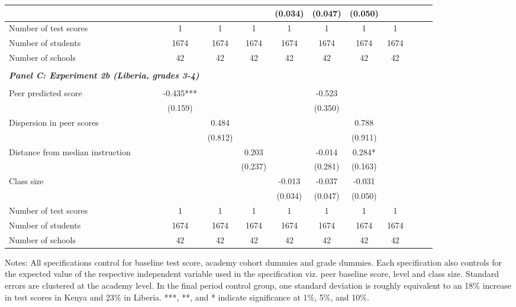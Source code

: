 \begin{center}
\begin{scriptsize}
\begin{threeparttable}
\begin{tabular} {@{} l l c c c c c c c c c c  @{}}
                 &  &  &  &  & (0.034) & (0.047) & (0.050) \\
\midrule
Number of test scores &  & 1 & 1 & 1 & 1 & 1 & 1 & 1 \\
Number of students &  & 1674 & 1674 & 1674 & 1674 & 1674 & 1674 & 1674 \\
Number of schools &  & 42 & 42 & 42 & 42 & 42 & 42 & 42 \\
 \midrule
\\
\multicolumn{3}{l}{\textbf{\textit{Panel C: Experiment 2b (Liberia, grades 3-4)}}} \\
\\
Peer predicted score &  & -0.435*** &  &  &  & -0.523 &  \\
                 &  & (0.159) &  &  &  & (0.350) &  \\
Dispersion in peer scores &  &  & 0.484 &  &  &  & 0.788 \\
                 &  &  & (0.812) &  &  &  & (0.911) \\
Distance from median instruction &  &  &  & 0.203 &  & -0.014 & 0.284* \\
                 &  &  &  & (0.237) &  & (0.281) & (0.163) \\
Class size &  &  &  &  & -0.013 & -0.037 & -0.031 \\
                 &  &  &  &  & (0.034) & (0.047) & (0.050) \\
\midrule
Number of test scores &  & 1 & 1 & 1 & 1 & 1 & 1 & 1 \\
Number of students &  & 1674 & 1674 & 1674 & 1674 & 1674 & 1674 & 1674 \\
Number of schools &  & 42 & 42 & 42 & 42 & 42 & 42 & 42 \\
\bottomrule
\end{tabular}
\begin{tablenotes}
\item Notes: All specifications control for baseline test score, academy cohort dummies and grade dummies. Each specification also controls for the expected value of the respective independent variable used in the specification viz. peer baseline score, level and class size. Standard errors are clustered at the academy level. In the final period control group, one standard deviation is roughly equivalent to an 18\% increase in test scores in Kenya and 23\% in Liberia. ***, **, and * indicate significance at 1\%, 5\%, and 10\%.\end{tablenotes}
\end{threeparttable}
\end{scriptsize}
\end{center}
\clearpage
